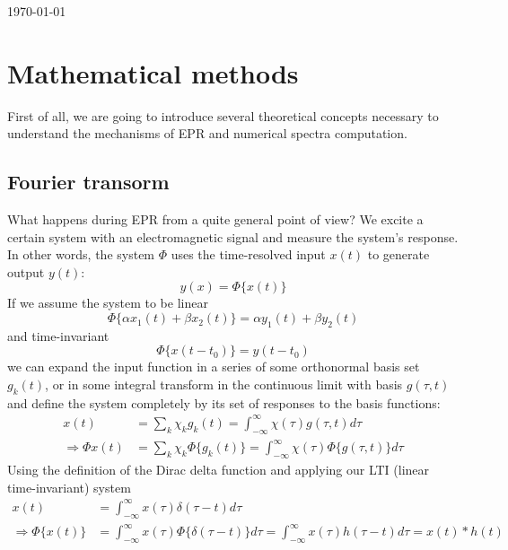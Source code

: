 \documentclass[11.5pt,a4paper]{article}
\begin{document}
\newpage
\tableofcontents

\vfill
\hfill \today 


\newpage

\section{Mathematical methods}
First of all, we are going to introduce several theoretical concepts necessary to understand the mechanisms of EPR and numerical spectra computation.

\subsection{Fourier transorm}
What happens during EPR from a quite general point of view? We excite a certain system with an electromagnetic signal and measure the system's response. In other words, the system $\Phi$ uses the time-resolved input $x(t)$ to generate output $y(t)$:
\begin{equation}
	y(x) = \Phi\{x(t)\}
\end{equation}
If we assume the system to be linear
\begin{equation}
 	\Phi\{\alpha x_1(t) + \beta x_2(t)\} = \alpha y_1(t) + \beta y_2(t)
\end{equation}
and time-invariant
\begin{equation}
	\Phi\{x(t-t_0)\} = y(t-t_0)
\end{equation}
we can expand the input function in a series of some orthonormal basis set $g_k(t)$, or in some integral transform in the continuous limit with basis $g(\tau,t)$ and define the system completely by its set of responses to the basis functions:
\begin{align}
	x(t) & = \sum_k \chi_k g_k(t) = \int_{-\infty}^{\infty} \chi(\tau) g(\tau,t) d\tau \\
	\Rightarrow \Phi{x(t)} & = \sum_k \chi_k \Phi\{g_k(t)\} = \int_{-\infty}^{\infty} \chi(\tau) \Phi\{g(\tau,t)\} d\tau
\end{align}
Using the definition of the Dirac delta function and applying our LTI (linear time-invariant) system
\begin{align}
	x(t) & =  \int_{-\infty}^{\infty} x(\tau) \delta(\tau-t) d\tau \\
	\Rightarrow 	\Phi\{x(t)\} & =  \int_{-\infty}^{\infty} x(\tau) \Phi\{\delta(\tau-t)\} d\tau = \int_{-\infty}^{\infty} x(\tau) h(\tau-t) d\tau = x(t) * h(t)
\end{align}
\end{document}
